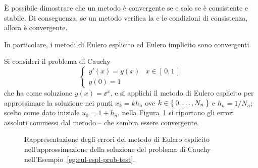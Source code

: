 	\begin{osservazione}
		È possibile dimostrare che un metodo è convergente se e solo se è consistente e stabile. Di conseguenza, se un metodo verifica la  e le condizioni di consistenza, allora è convergente.
		
		In particolare, i metodi di Eulero esplicito ed Eulero implicito sono convergenti.
	\end{osservazione}

	\begin{esempio}\label{eg:eul-espl-prob-test}
		Si consideri il problema di Cauchy
		\begin{equation*}
			\begin{cases}
				y' (x) = y (x) & x \in [\, 0, 1 \,] \\
				y (0) = 1
			\end{cases}
		\end{equation*}
		che ha come soluzione \(y (x) = \ee^x\), e si applichi il metodo di Eulero esplicito per approssimare la soluzione nei punti \(x_k = k h_n\) ove \(k \in \Set{0, \dots, N_n}\) e \(h_n = 1 / N_n\); scelto come dato iniziale \(u_0 = 1 + h_n\), nella Figura~\ref{fig:eul-espl-prob-test} si riportano gli errori assoluti commessi dal metodo -- che sembra essere convergente.
		
		\begin{figure}[tpb]
			\centering
			
		
			\caption{Rappresentazione degli errori del metodo di Eulero esplicito nell'approssimazione della soluzione del problema di Cauchy nell'Esempio~\ref{eg:eul-espl-prob-test}.}\label{fig:eul-espl-prob-test}
		\end{figure}
	\end{esempio}

